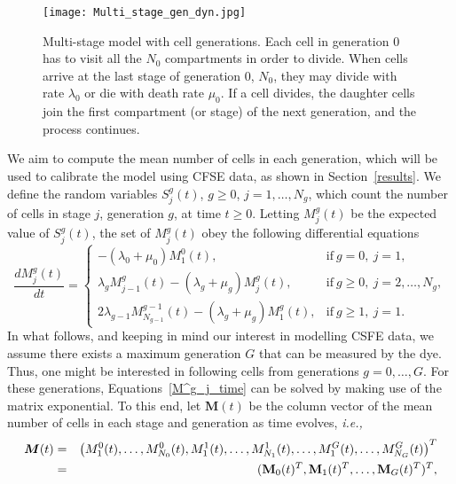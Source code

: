 \documentclass[10pt]{article}
\numberwithin{equation}{section}
\begin{document}
\begin{figure}
\begin{center}
\texttt{[image: Multi\_stage\_gen\_dyn.jpg]}
\end{center}
\caption{Multi-stage model with cell generations. Each cell in generation $0$ has to visit all the $N_0$ compartments in order  to divide. When cells arrive 
at the last stage of generation $0$, $N_0$, they may divide with rate $\lambda_0$ or die with death rate $\mu_0$. If a cell divides, the daughter cells join the first compartment (or stage) of the next generation, and the process continues.}
    \label{model_dyn}
\end{figure}

We aim to compute the mean number of cells in each generation, which will be used to calibrate the model using CFSE data, as shown in Section~\ref{results}. We define the random variables $S^g_j(t)$, $g \ge 0$, $j=1,\ldots,N_g$, which count the number of cells in stage $j$, generation $g$, at time $t\geq0$. Letting $M^g_j(t)$ be the expected value of $S^g_j(t)$, the set of $M^g_j(t)$ obey the 
following differential equations
\begin{equation} \label{M^g_j_time}
\frac{d M^g_j(t)}{dt}=
\begin{cases}
-(\lambda_0 + \mu_0) M^0_1(t), & \text{if} \ g=0, \ j=1, \\
\lambda_g M^g_{j-1}(t) - (\lambda_g + \mu_g) M^g_j(t), & \text{if} \ g \ge 0, \ j=2, \ldots, N_g, \\
2 \lambda_{g-1} M^{g-1}_{N_{g-1}}(t) - (\lambda_g + \mu_g) M^g_1(t), & \text{if} \ g \ge 1, \ j=1.
\end{cases}
\end{equation}
In what follows, and keeping in mind 
our interest in modelling CSFE data, we assume  there exists a maximum generation $G$ that can be measured by the dye. Thus, one might be  interested in following cells from generations $g=0,\ldots,G$. For these generations, Equations~\eqref{M^g_j_time} can be solved by making use of the matrix exponential. To this end, let $\boldsymbol{M}(t)$ be the column vector of the mean number of cells in each stage and generation as time evolves, {\em i.e.,}
\begin{eqnarray*}
    \boldsymbol{M}(t) &=& \left(M^0_1(t), \dots, M^0_{N_0}(t), M^1_1(t), \dots, M^1_{N_1}(t), \dots, M^G_1(t), \dots, M^G_{N_G}(t) \right)^T\\
&=& ({\bf M}_0(t)^T,{\bf M}_1(t)^T,\dots,{\bf M}_G(t)^T)^T,    
\end{eqnarray*}
\end{document}
